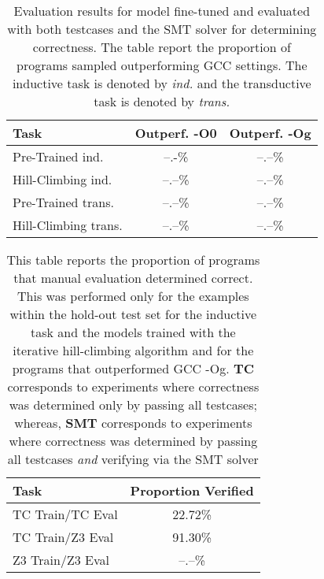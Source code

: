 \documentclass{article}
\begin{document}
\begin{table}[t]
\caption{Evaluation results for model fine-tuned and evaluated with both testcases and the SMT solver for determining correctness. The table report the proportion of programs sampled outperforming GCC settings. The inductive task is denoted by \textit{ind.} and the transductive task is denoted by \textit{trans.}}
\label{tab:z3_inner_loop_results}
\vskip 0.15in
\begin{center}
\begin{small}
\begin{sc}
\begin{tabular}{lcc}
\toprule
Task & Outperf. -O0 & Outperf. -Og \\
\midrule
Pre-Trained ind.    & --.-\% & --.--\% \\
Hill-Climbing ind.  & --.--\% & --.--\% \\
Pre-Trained trans.   & --.--\% & --.--\% \\
Hill-Climbing trans.  & --.--\% & --.--\% \\
\bottomrule
\end{tabular}
\end{sc}
\end{small}
\end{center}
\vskip -0.1in
\end{table}


\begin{table}[t]
\caption{This table reports the proportion of programs that manual evaluation determined correct. This was performed only for the examples within the hold-out test set for the inductive task and the models trained with the iterative hill-climbing algorithm and for the programs that outperformed GCC -Og.  \textbf{TC} corresponds to experiments where correctness was determined only by passing all testcases; whereas, \textbf{SMT} corresponds to experiments where correctness was determined by passing all testcases \textit{and} verifying via the SMT solver}
\label{tab:manual}
\vskip 0.15in
\begin{center}
\begin{small}
\begin{sc}
\begin{tabular}{lc}
\toprule
Task & Proportion Verified \\
\midrule
TC Train/TC Eval  & 22.72\%\\
TC Train/Z3 Eval   & 91.30\%\\
Z3 Train/Z3 Eval  & --.--\%\\
\bottomrule
\end{tabular}
\end{sc}
\end{small}
\end{center}
\vskip -0.1in
\end{table}
\end{document}

